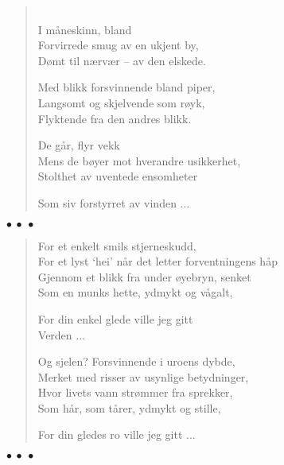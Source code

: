 \documentclass[12pt]{article}
\newenvironment{wier}
	{\begin{verse}}
	{\end{verse} \begin{center}$\bullet\ \bullet\ \bullet$\end{center}}
\newenvironment{wiersz}[1]
	{\begin{verse} \hspace*{-1em}{\bf #1}}
	{\end{verse} \begin{center}$\bullet\ \bullet\ \bullet$\end{center}}
\begin{document}
\begin{wiersz}
{Jeg s{\aa} et par}\\
I m{\aa}neskinn, bland\\
Forvirrede smug av en ukjent by,\\
D{\o}mt til n{\ae}rv{\ae}r -- av den elskede.

Med blikk forsvinnende bland piper,\\
Langsomt og skjelvende som r{\o}yk,\\
Flyktende fra den andres blikk.

De g{\aa}r, flyr vekk\\
Mens de b{\o}yer mot hverandre usikkerhet,\\
Stolthet av uventede ensomheter

Som siv forstyrret av vinden ...
\end{wiersz}

\begin{wier}
For et enkelt smils stjerneskudd,\\
For et lyst `hei' n{\aa}r det letter forventningens h{\aa}p\\
Gjennom et blikk fra under {\o}yebryn, senket\\
Som en munks hette, ydmykt og v{\aa}galt,

For din enkel glede ville jeg gitt\\
Verden ...

Og sjelen? Forsvinnende i uroens dybde,\\
Merket med risser av usynlige betydninger,\\
Hvor livets vann str{\o}mmer fra sprekker,\\
Som h{\aa}r, som t{\aa}rer, ydmykt og stille,

For din gledes ro ville jeg gitt ...
\end{wier}
\end{document}

